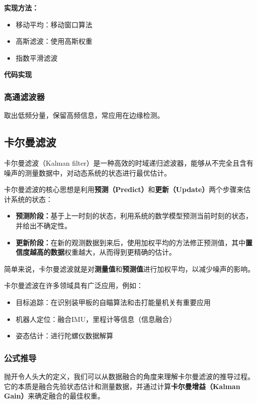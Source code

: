 \textbf{实现方法：}
\begin{itemize}
    \item 移动平均：移动窗口算法
    \item 高斯滤波：使用高斯权重
    \item 指数平滑滤波
\end{itemize}

\textbf{代码实现}


\subsubsection{高通滤波器}
取出低频分量，保留高频信息，常应用在边缘检测。

\subsection{卡尔曼滤波}
卡尔曼滤波（Kalman filter）是一种高效的时域递归滤波器，能够从不完全且含有噪声的测量数据中，对动态系统的状态进行最优估计。

卡尔曼滤波的核心思想是利用\textbf{预测（Predict）}和\textbf{更新（Update）}两个步骤来估计系统的状态：
\begin{itemize}
    \item \textbf{预测阶段：}基于上一时刻的状态，利用系统的数学模型预测当前时刻的状态，并给出不确定性。
    \item \textbf{更新阶段：}在新的观测数据到来后，使用加权平均的方法修正预测值，其中\textbf{置信度越高的数据}权重越大，从而得到更精确的估计。
\end{itemize}
简单来说，卡尔曼滤波就是对\textbf{测量值}和\textbf{预测值}进行加权平均，以减少噪声的影响。

卡尔曼滤波在许多领域具有广泛应用，例如：
\begin{itemize}
    \item 目标追踪：在识别装甲板的自瞄算法和击打能量机关有重要应用
    \item 机器人定位：融合IMU，里程计等信息（信息融合）
    \item 姿态估计：进行陀螺仪数据解算
\end{itemize}

\subsubsection{公式推导}
抛开令人头大的定义，我们可以从数据融合的角度来理解卡尔曼滤波的推导过程。它的本质是融合先验状态估计和测量数据，并通过计算\textbf{卡尔曼增益（Kalman Gain）}来确定融合的最佳权重。

